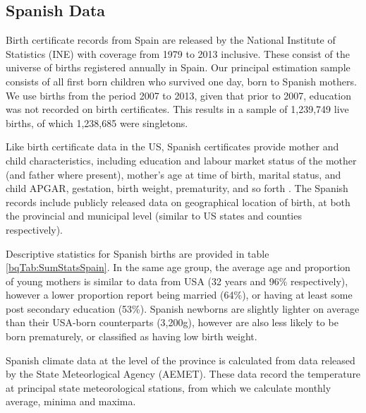 \documentclass[a4paper, 12 pt]{article}
\theoremstyle{plain}
\begin{document}
\begin{doublespace}
\subsection{Spanish Data}

Birth certificate records from Spain are released by the National Institute of Statistics (INE)
with coverage from 1979 to 2013 inclusive. These consist of the universe of
births registered annually in Spain. Our principal estimation sample consists of
all first born children who survived one day, born to Spanish mothers. We use
births from the period 2007 to 2013, given that prior to 2007, education was not
recorded on birth certificates.  This results in a sample of 1,239,749 live
births, of which 1,238,685 were singletons.

Like birth certificate data in the US, Spanish certificates provide mother
and child characteristics, including education and labour market status of the
mother (and father where present), mother's age at time of birth, marital
status, and child APGAR, gestation, birth weight, prematurity, and so forth
\citep{INE2013}.  The Spanish records include publicly released data on
geographical location of birth, at both the provincial and municipal level
(similar to US states and counties respectively).

Descriptive statistics for Spanish births are provided in table \ref{bqTab:SumStatsSpain}.  In the same
age group, the average age and proportion of young mothers is similar to data
from USA (32 years and 96\% respectively), however a lower proportion report
being married (64\%), or having at least some post secondary education (53\%).
Spanish newborns are slightly lighter on average than their USA-born
counterparts (3,200g), however are also less likely to be born prematurely,
or classified as having low birth weight.

Spanish climate data at the level of the province is calculated from data released by the State Meteorlogical
Agency (AEMET). These data record the temperature at principal state
meteorological stations, from which we calculate monthly average, minima and
maxima.



\end{doublespace}
\end{document}
